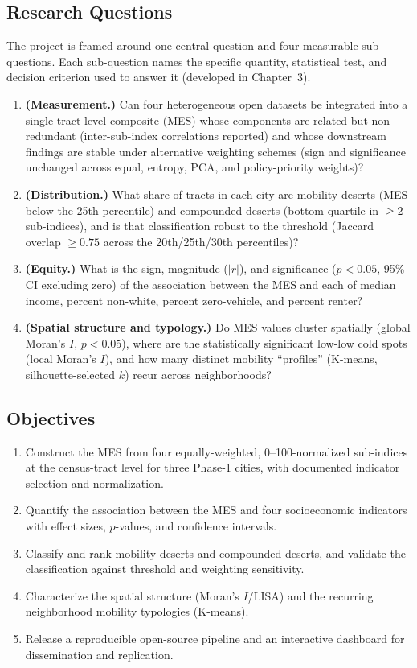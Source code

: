 \documentclass[11pt]{article}
\begin{document}
\subsection{Research Questions}
The project is framed around one central question and four measurable
sub-questions. Each sub-question names the specific quantity, statistical test,
and decision criterion used to answer it (developed in Chapter~3).

\begin{enumerate}[leftmargin=1.5em,itemsep=2pt,label=\textbf{RQ\arabic*.}]
\item \textbf{(Measurement.)} Can four heterogeneous open datasets be integrated
into a single tract-level composite (MES) whose components are related but
non-redundant (inter-sub-index correlations reported) and whose downstream
findings are stable under alternative weighting schemes (sign and significance
unchanged across equal, entropy, PCA, and policy-priority weights)?
\item \textbf{(Distribution.)} What share of tracts in each city are mobility
deserts (MES below the 25th percentile) and compounded deserts (bottom quartile
in $\geq 2$ sub-indices), and is that classification robust to the threshold
(Jaccard overlap $\geq 0.75$ across the 20th/25th/30th percentiles)?
\item \textbf{(Equity.)} What is the sign, magnitude ($|r|$), and significance
($p < 0.05$, 95\% CI excluding zero) of the association between the MES and each
of median income, percent non-white, percent zero-vehicle, and percent renter?
\item \textbf{(Spatial structure and typology.)} Do MES values cluster spatially
(global Moran's $I$, $p < 0.05$), where are the statistically significant
low-low cold spots (local Moran's $I$), and how many distinct mobility
``profiles'' (K-means, silhouette-selected $k$) recur across neighborhoods?
\end{enumerate}

\subsection{Objectives}
\begin{enumerate}[leftmargin=1.5em,itemsep=2pt,label=\textbf{O\arabic*.}]
\item Construct the MES from four equally-weighted, 0--100-normalized
sub-indices at the census-tract level for three Phase-1 cities, with documented
indicator selection and normalization.
\item Quantify the association between the MES and four socioeconomic indicators
with effect sizes, $p$-values, and confidence intervals.
\item Classify and rank mobility deserts and compounded deserts, and validate the
classification against threshold and weighting sensitivity.
\item Characterize the spatial structure (Moran's $I$/LISA) and the recurring
neighborhood mobility typologies (K-means).
\item Release a reproducible open-source pipeline and an interactive dashboard
for dissemination and replication.
\end{enumerate}
\end{document}
